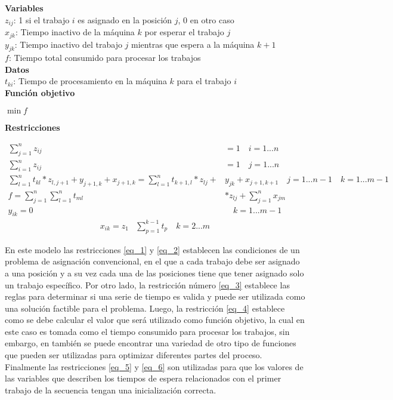 \documentclass[10pt, twoside]{article}
\begin{document}
\noindent
\textbf{Variables}\\
$z_{ij}$: 1 si el trabajo $i$ es asignado en la posición $j$, 0 en otro caso\\
$x_{jk}$: Tiempo inactivo de la máquina $k$ por esperar el trabajo $j$\\
$y_{jk}$: Tiempo inactivo del trabajo $j$ mientras que espera a la máquina $k+1$\\
$f$: Tiempo total consumido para procesar los trabajos\\

\noindent
\textbf{Datos}\\
$t_{ki}$: Tiempo de procesamiento en la máquina $k$ para el trabajo $i$\\

\noindent
\textbf{Función objetivo}
\begin{center}
$\min f$
\end{center}

\noindent
\textbf{Restricciones}

\begin{align}
    \label{eq_1} \sum_{j=1}^{n} z_{ij} &= 1 \quad i=1...n \\
    \label{eq_2} \sum_{i=1}^{n} z_{ij} &= 1 \quad j=1...n \\
    \label{eq_3} \sum_{l=1}^{n}t_{kl} * z_{l,j+1} + y_{j+1,k} + x_{j+1,k} = \sum_{l=1}^{n} t_{k+1,l} * z_{lj} + &y_{jk} + x_{j+1,k+1} \quad j=1...n-1 \quad k=1...m-1\\
    \label{eq_4} f = \sum_{j=1}^{n} \sum_{l=1}^{n} t_{ml} &* z_{lj} + \sum_{j=1}^{n} x_{jm}\\
    \label{eq_5} y_{ik} = 0& \quad k=1...m-1
\end{align}
\begin{align}
    \label{eq_6} x_{ik} = z_1 &\sum_{p=1}^{k-1} t_p \quad k=2...m
\end{align}

En este modelo las restricciones \ref{eq_1} y \ref{eq_2} establecen las condiciones
de un problema de asignación convencional, en el que a cada trabajo debe ser
asignado a una posición y a su vez cada una de las posiciones tiene que tener
asignado solo un trabajo específico. Por otro lado, la restricción número \ref{eq_3}
establece las reglas para determinar si una serie de tiempo es valida y puede
ser utilizada como una solución factible para el problema. Luego, la restricción
\ref{eq_4} establece como se debe calcular el valor que será utilizado
como función objetivo, la cual en este caso es tomada como el tiempo consumido para
procesar los trabajos, sin embargo, en \cite{model} también se puede encontrar
una variedad de otro tipo de funciones que pueden ser utilizadas para optimizar
diferentes partes del proceso. Finalmente las restricciones \ref{eq_5} y \ref{eq_6}
son utilizadas para que los valores de las variables que describen los tiempos
de espera relacionados con el primer trabajo de la secuencia tengan una
inicialización correcta.\\
\end{document}
